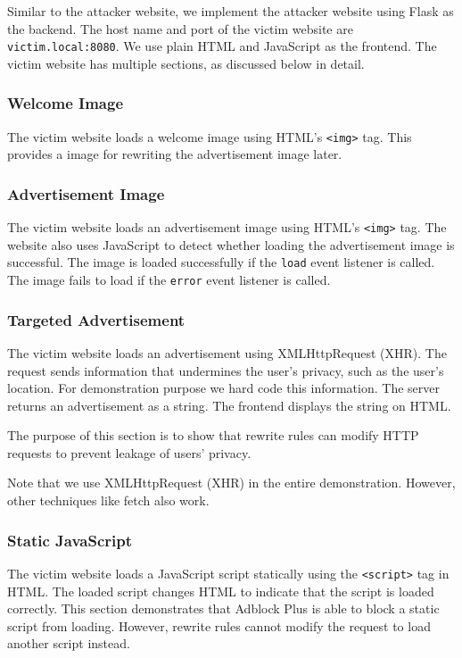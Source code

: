 \documentclass[conference]{IEEEtran}
\begin{document}
Similar to the attacker website, we implement the attacker website using Flask as the backend. The host name and port of the victim website are \lstinline{victim.local:8080}. We use plain HTML and JavaScript as the frontend. The victim website has multiple sections, as discussed below in detail.

\subsubsection{Welcome Image}

The victim website loads a welcome image using HTML's \lstinline{<img>} tag. This provides a image for rewriting the advertisement image later.

\subsubsection{Advertisement Image}

The victim website loads an advertisement image using HTML's \lstinline{<img>} tag. The website also uses JavaScript to detect whether loading the advertisement image is successful. The image is loaded successfully if the \lstinline{load} event listener is called. The image fails to load if the \lstinline{error} event listener is called.

\subsubsection{Targeted Advertisement}

The victim website loads an advertisement using XMLHttpRequest (XHR). The request sends information that undermines the user's privacy, such as the user's location. For demonstration purpose we hard code this information. The server returns an advertisement as a string. The frontend displays the string on HTML.

The purpose of this section is to show that rewrite rules can modify HTTP requests to prevent leakage of users' privacy.

Note that we use XMLHttpRequest (XHR) in the entire demonstration. However, other techniques like fetch also work.

\subsubsection{Static JavaScript}

The victim website loads a JavaScript script statically using the \lstinline{<script>} tag in HTML. The loaded script changes HTML to indicate that the script is loaded correctly. This section demonstrates that Adblock Plus is able to block a static script from loading. However, rewrite rules cannot modify the request to load another script instead.
\end{document}
